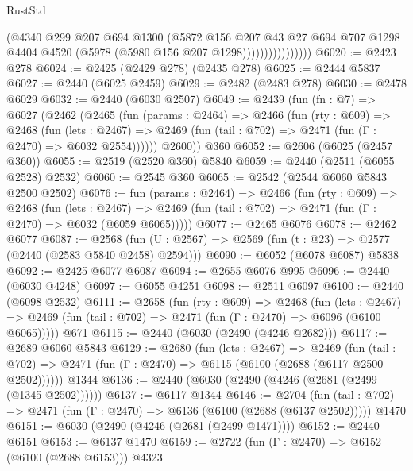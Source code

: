 \begin{lexlean}{RustStd}
\begin{coremodule}
{\begin{coremodule}
{{{{{{{{{{{{                            (@4340
                              @299
                              @207
                              @694
                              @1300
                              (@5872
                                @156
                                @207
                                @43
                                @27
                                @694
                                @707
                                @1298
                                @4404
                                @4520
                                (@5978 (@5980 @156 @207 @1298))))))))))))))))
@6020 := @2423 @278
@6024 := @2425 (@2429 @278) (@2435 @278)
@6025 := @2444 @5837
@6027 := @2440 (@6025 @2459)
@6029 := @2482 (@2483 @278)
@6030 := @2478 @6029
@6032 := @2440 (@6030 @2507)
@6049 := @2439
    (fun (fn : @7) =>
    @6027
      (@2462
        (@2465
          (fun (params : @2464) =>
          @2466
            (fun (rty : @609) =>
            @2468
              (fun (lets : @2467) =>
              @2469 (fun (tail : @702) => @2471 (fun (Γ : @2470) => @6032 @2554))))))
        @2600))
    @360
@6052 := @2606 (@6025 (@2457 @360))
@6055 := @2519 (@2520 @360) @5840
@6059 := @2440 (@2511 (@6055 @2528) @2532)
@6060 := @2545 @360
@6065 := @2542 (@2544 @6060 @5843 @2500 @2502)
@6076 := fun (params : @2464) =>
  @2466
    (fun (rty : @609) =>
    @2468
      (fun (lets : @2467) =>
      @2469 (fun (tail : @702) => @2471 (fun (Γ : @2470) => @6032 (@6059 @6065)))))
@6077 := @2465 @6076
@6078 := @2462 @6077
@6087 := @2568 (fun (U : @2567) => @2569 (fun (t : @23) => @2577 (@2440 (@2583 @5840 @2458) @2594)))
@6090 := @6052 (@6078 @6087) @5838
@6092 := @2425 @6077 @6087
@6094 := @2655 @6076 @995
@6096 := @2440 (@6030 @4248)
@6097 := @6055 @4251
@6098 := @2511 @6097
@6100 := @2440 (@6098 @2532)
@6111 := @2658
    (fun (rty : @609) =>
    @2468
      (fun (lets : @2467) =>
      @2469 (fun (tail : @702) => @2471 (fun (Γ : @2470) => @6096 (@6100 @6065)))))
    @671
@6115 := @2440 (@6030 (@2490 (@4246 @2682)))
@6117 := @2689 @6060 @5843
@6129 := @2680
    (fun (lets : @2467) =>
    @2469
      (fun (tail : @702) => @2471 (fun (Γ : @2470) => @6115 (@6100 (@2688 (@6117 @2500 @2502))))))
    @1344
@6136 := @2440 (@6030 (@2490 (@4246 (@2681 (@2499 (@1345 @2502))))))
@6137 := @6117 @1344
@6146 := @2704
    (fun (tail : @702) => @2471 (fun (Γ : @2470) => @6136 (@6100 (@2688 (@6137 @2502)))))
    @1470
@6151 := @6030 (@2490 (@4246 (@2681 (@2499 @1471))))
@6152 := @2440 @6151
@6153 := @6137 @1470
@6159 := @2722 (fun (Γ : @2470) => @6152 (@6100 (@2688 @6153))) @4323
}}}}}}}}}}}}
\end{coremodule}}
\end{coremodule}
\end{lexlean}
